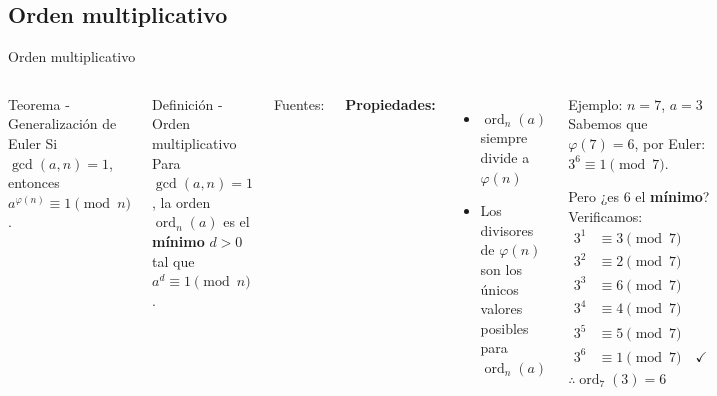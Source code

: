 \documentclass[aspectratio=169]{beamer}
\begin{document}
\subsection{Orden multiplicativo}
\begin{frame}{Orden multiplicativo}
\begin{columns}[T]
\begin{alertblock}{Teorema - Generalización de Euler}
Si $\gcd(a,n)=1$, entonces\\ 
$a^{\varphi(n)}\equiv 1 \pmod n$.
\end{alertblock}
\begin{block}{Definición - Orden multiplicativo}
Para $\gcd(a,n)=1$, la orden $\operatorname{ord}_n(a)$ es el \textbf{mínimo} $d>0$ tal que $a^d\equiv1\pmod n$.
\end{block}
\scriptsize Fuentes: \cite{eulertheorem}

\normalsize
\textbf{Propiedades:}
\begin{itemize}
\item $\operatorname{ord}_n(a)$ siempre divide a $\varphi(n)$
\item Los divisores de $\varphi(n)$ son los únicos valores posibles para $\operatorname{ord}_n(a)$
\end{itemize}

\begin{exampleblock}{Ejemplo: $n=7$, $a=3$}
Sabemos que $\varphi(7)=6$, por Euler: $3^6 \equiv 1 \pmod 7$.

Pero ¿es 6 el \textbf{mínimo}? Verificamos:
\[
\begin{aligned}
3^1 &\equiv 3 \pmod 7\\
3^2 &\equiv 2 \pmod 7\\
3^3 &\equiv 6 \pmod 7\\
3^4 &\equiv 4 \pmod 7\\
3^5 &\equiv 5 \pmod 7\\
3^6 &\equiv 1 \pmod 7 \quad \checkmark
\end{aligned}
\]
$\therefore \operatorname{ord}_7(3)=6$
\end{exampleblock}
\end{columns}
\end{frame}
\end{document}
